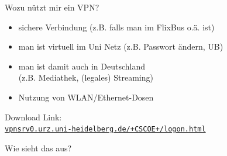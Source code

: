 \begin{frame}{Wozu nützt mir ein VPN?}
    \large
    \begin{itemize}
        \item sichere Verbindung (z.B. falls man im FlixBus o.ä. ist)
        \item man ist \glqq{}virtuell\grqq{} im Uni Netz (z.B. Passwort ändern, UB)
        \item man ist damit auch in Deutschland \\
            (z.B. Mediathek, (legales) Streaming)
        \item Nutzung von WLAN/Ethernet-Dosen
    \end{itemize}
    Download Link: \\
    {\normalsize \href{https://vpnsrv0.urz.uni-heidelberg.de/+CSCOE+/logon.html}{\texttt{vpnsrv0.urz.uni-heidelberg.de/+CSCOE+/logon.html}}}
\end{frame}

\begin{frame}{Wie sieht das aus?}
    \begin{center}
    \end{center}
\end{frame}



